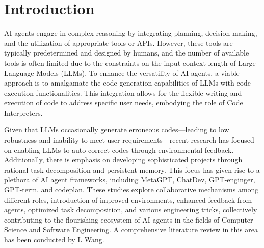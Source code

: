 \section{Introduction}

AI agents engage in complex reasoning by integrating planning, decision-making, and the utilization of appropriate tools or APIs. However, these tools are typically predetermined and designed by humans, and the number of available tools is often limited due to the constraints on the input context length of Large Language Models (LLMs). To enhance the versatility of AI agents, a viable approach is to amalgamate the code-generation capabilities of LLMs with code execution functionalities. This integration allows for the flexible writing and execution of code to address specific user needs, embodying the role of Code Interpreters.

Given that LLMs occasionally generate erroneous codes—leading to low robustness and inability to meet user requirements—recent research has focused on enabling LLMs to auto-correct codes through environmental feedback. Additionally, there is emphasis on developing sophisticated projects through rational task decomposition and persistent memory. This focus has given rise to a plethora of AI agent frameworks, including MetaGPT, ChatDev, GPT-enginger, GPT-term, and codeplan. These studies explore collaborative mechanisms among different roles, introduction of improved environments, enhanced feedback from agents, optimized task decomposition, and various engineering tricks, collectively contributing to the flourishing ecosystem of AI agents in the fields of Computer Science and Software Engineering. A comprehensive literature review in this area has been conducted by L Wang.



